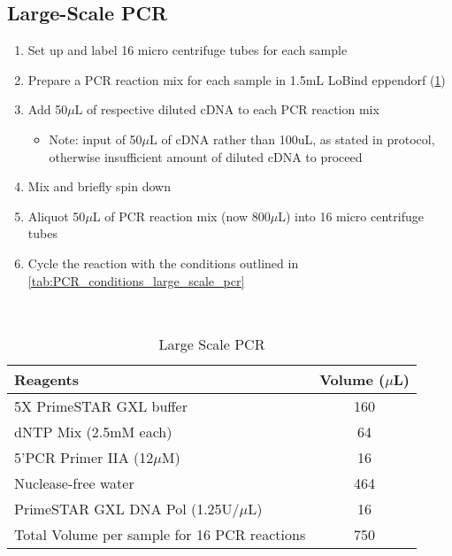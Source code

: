 \subsection{Large-Scale PCR} 
\label{Isoseq_Protocol_largescalepcr}
\begin{enumerate}
	\item Set up and label 16 micro centrifuge tubes for each sample 
	\item Prepare a PCR reaction mix for each sample in 1.5mL LoBind eppendorf (\cref{tab:large_scale_pcr})
	\item Add 50$\mu$L of respective diluted cDNA to each PCR reaction mix 
	\begin{itemize}
		\item Note: input of 50$\mu$L of cDNA rather than 100uL, as stated in protocol, otherwise insufficient amount of diluted cDNA to proceed
	\end{itemize}
	\item Mix and briefly spin down
	\item Aliquot 50$\mu$L of PCR reaction mix (now 800$\mu$L) into 16 micro centrifuge tubes
	\item Cycle the reaction with the conditions outlined in \cref{tab:PCR_conditions_large_scale_pcr} 
\end{enumerate}
\
\begin{table}[ht]
	\centering
	\begin{tabularx}{0.8\textwidth}{lc}
		\toprule 
		Reagents                                     & Volume ($\mu$L) \\ \midrule
		5X PrimeSTAR GXL buffer                      & 160         \\
		dNTP Mix (2.5mM each)                        & 64          \\
		5'PCR Primer IIA (12$\mu$M)                      & 16          \\
		Nuclease-free water                          & 464         \\
		PrimeSTAR GXL DNA Pol (1.25U/$\mu$L)             & 16          \\
		Total Volume per sample for 16 PCR reactions & 750 \\
		\bottomrule        
	\end{tabularx}
	\caption{Large Scale PCR}
	\label{tab:large_scale_pcr}
\end{table}

